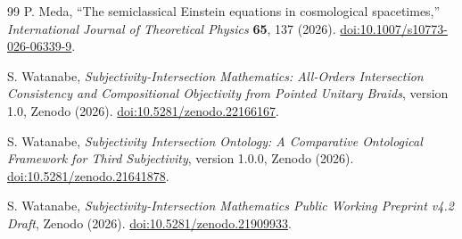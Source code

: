 \documentclass[11pt]{article}
\theoremstyle{definition}
\theoremstyle{remark}
\begin{document}
\begin{thebibliography}{99}
P. Meda, ``The semiclassical Einstein equations in cosmological spacetimes,'' \emph{International Journal of Theoretical Physics} \textbf{65}, 137 (2026). \href{https://doi.org/10.1007/s10773-026-06339-9}{doi:10.1007/s10773-026-06339-9}.

S. Watanabe, \emph{Subjectivity-Intersection Mathematics: All-Orders Intersection Consistency and Compositional Objectivity from Pointed Unitary Braids}, version 1.0, Zenodo (2026). \href{https://doi.org/10.5281/zenodo.22166167}{doi:10.5281/zenodo.22166167}.

S. Watanabe, \emph{Subjectivity Intersection Ontology: A Comparative Ontological Framework for Third Subjectivity}, version 1.0.0, Zenodo (2026). \href{https://doi.org/10.5281/zenodo.21641878}{doi:10.5281/zenodo.21641878}.

S. Watanabe, \emph{Subjectivity-Intersection Mathematics Public Working Preprint v4.2 Draft}, Zenodo (2026). \href{https://doi.org/10.5281/zenodo.21909933}{doi:10.5281/zenodo.21909933}.

\end{thebibliography}
\end{document}
